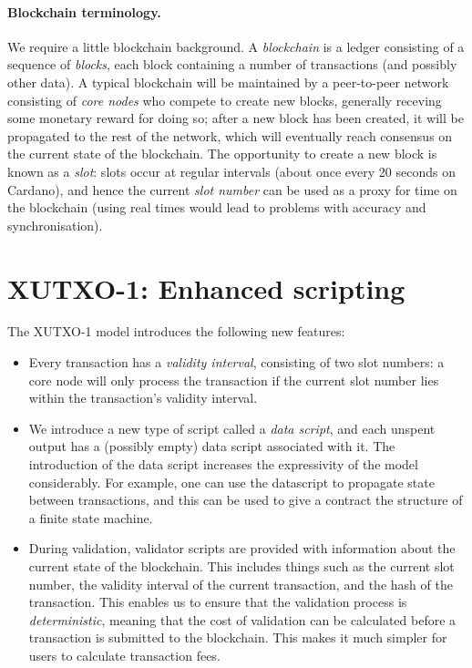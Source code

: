 \documentclass[a4paper]{article}
\renewcommand{\i}{\textit}  %
\theoremstyle{definition}  %
\begin{document}
\paragraph{Blockchain terminology.}
\label{sec:blockchain-terminology}
We require a little blockchain background. A \textit{blockchain} is a
ledger consisting of a sequence of \textit{blocks}, each block
containing a number of transactions (and possibly other data).  A
typical blockchain will be maintained by a peer-to-peer network
consisting of \textit{core nodes} who compete to create new blocks,
generally receving some monetary reward for doing so; after a new
block has been created, it will be propagated to the rest of the
network, which will eventually reach consensus on the current state of
the blockchain.  The opportunity to create a new block is known as a
\textit{slot}: slots occur at regular intervals (about once every 20
seconds on Cardano), and hence the current \textit{slot number} can be
used as a proxy for time on the blockchain (using real times would
lead to problems with accuracy and synchronisation).


\section{XUTXO-1: Enhanced scripting}
\label{sec:xutxo-1}
The XUTXO-1 model introduces the following new features:

\begin{itemize}
\item Every transaction has a \textit{validity interval}, consisting
  of two slot numbers: a core node will only process the transaction
  if the current slot number lies within the transaction's validity
  interval.

\item We introduce a new type of script called a \i{data script}, and
  each unspent output has a (possibly empty) data script associated
  with it.  The introduction of the data script increases the
  expressivity of the model considerably. For example, one can use the
  datascript to propagate state between transactions, and this can be
  used to give a contract the structure of a finite state machine.

\item During validation, validator scripts are provided with
  information about the current state of the blockchain.  This
  includes things such as the current slot number, the validity
  interval of the current transaction, and the hash of the
  transaction.  This enables us to ensure that the validation process
  is \i{deterministic}, meaning that the cost of validation can be
  calculated before a transaction is submitted to the blockchain.
  This makes it much simpler for users to calculate transaction fees.
\end{itemize}
  
\end{document}
